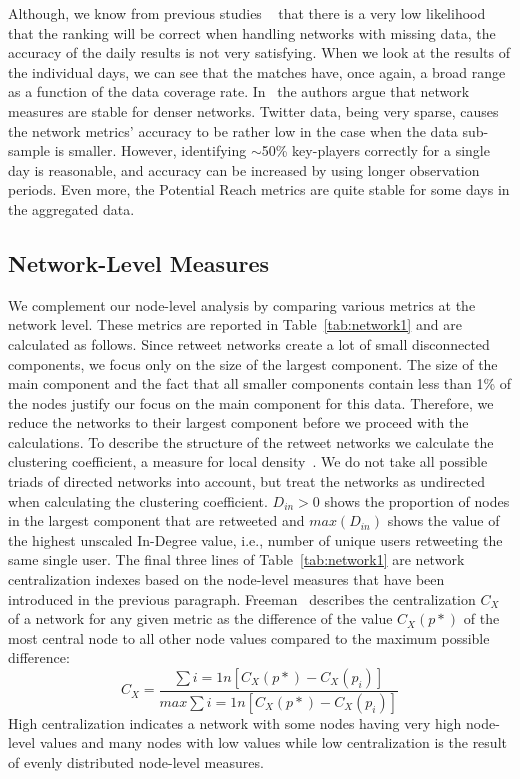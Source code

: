 \documentclass[letterpaper]{article}
\begin{document}
Although, we know from previous studies ~\cite{Borg06} that there is a very low likelihood that the ranking will be correct when handling networks with missing data, the accuracy of the daily results is not very satisfying. When we look at the results of the individual days, we can see that the matches have, once again, a broad range as a function of the data coverage rate. In~\cite{Borg06} the authors argue that network measures are stable for denser networks. Twitter data, being very sparse, causes the network metrics' accuracy to be rather low in the case when the data sub-sample is smaller. However, identifying $\sim$50\% key-players correctly for a single day is reasonable, and accuracy can be increased by using longer observation periods. Even more, the Potential Reach metrics are quite stable for some days in the aggregated data.

\subsection{Network-Level Measures}
We complement our node-level analysis by comparing various metrics at the network level. These metrics are reported in Table~\ref{tab:network1} and are calculated as follows. Since retweet networks create a lot of small disconnected components, we focus only on the size of the largest component. The size of the main component and the fact that all smaller components contain less than 1\% of the nodes justify our focus on the main component for this data. Therefore, we reduce the networks to their largest component before we proceed with the calculations. To describe the structure of the retweet networks we calculate the clustering coefficient, a measure for local density~\cite{Watts1998}. We do not take all possible triads of directed networks into account, but treat the networks as undirected when calculating the clustering coefficient. $D_{in}>0$ shows the proportion of nodes in the largest component that are retweeted and $max(D_{in})$ shows the value of the highest unscaled In-Degree value, i.e., number of unique users retweeting the same single user. The final three lines of Table~\ref{tab:network1} are network centralization indexes based on the node-level measures that have been introduced in the previous paragraph. Freeman~\cite{Freeman1979} describes the centralization $C_X$ of a network for any given metric as the difference of the value $C_X(p*)$ of the most central node to all other node values compared to the maximum possible difference:
\begin{equation}
C_X =  \frac{\sum{i=1}{n}{[C_X(p*)-C_X(p_i)]}}{max \sum{i=1}{n}{[C_X(p*)-C_X(p_i)]}}
\end{equation}
High centralization indicates a network with some nodes having very high node-level values and many nodes with low values while low centralization is the result of evenly distributed node-level measures.
\end{document}
